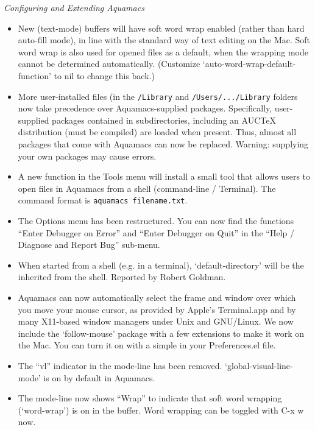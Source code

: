 \emph{Configuring and Extending Aquamacs}
\begin{itemize}
\item New (text-mode) buffers will have soft word wrap enabled (rather than hard auto-fill mode), in line with the standard way of text editing on the Mac.  Soft word wrap is also used for opened files as a default, when the wrapping mode cannot be determined automatically.  (Customize `auto-word-wrap-default-function' to nil to change this back.)

\item More user-installed files (in the {\tt /Library} and {\tt /Users/.../Library} folders now take precedence over Aquamacs-supplied packages.  Specifically, user-supplied packages contained in subdirectories, including an AUCTeX distribution (must be compiled) are loaded when present.  Thus, almost all packages that come with Aquamacs can now be replaced.
Warning: supplying your own packages may cause errors.

\item A new function in the Tools menu will install a small tool that allows users to open files in Aquamacs from a shell (command-line / Terminal).  The command format is {\tt aquamacs filename.txt}.

\item The Options menu has been restructured. You can now find the functions ``Enter Debugger on Error'' and ``Enter Debugger on Quit'' in the ``Help / Diagnose and Report Bug'' sub-menu.

\item When started from a shell (e.g. in a terminal), `default-directory' will be the inherited from the shell.
Reported by Robert Goldman.

\item Aquamacs can now automatically select the frame and window over which you move your mouse cursor, as provided by Apple's Terminal.app and by many X11-based window managers under Unix and GNU/Linux.  We now include the `follow-mouse' package with a few extensions to make it work on the Mac.  You can turn it on with a simple in your Preferences.el file.

\item The ``vl'' indicator in the mode-line has been removed. `global-visual-line-mode' is on by default in Aquamacs.
\item The mode-line now shows ``Wrap'' to indicate that soft word wrapping (`word-wrap') is on in the buffer.  Word wrapping can be toggled with C-x w now.



\end{itemize}
